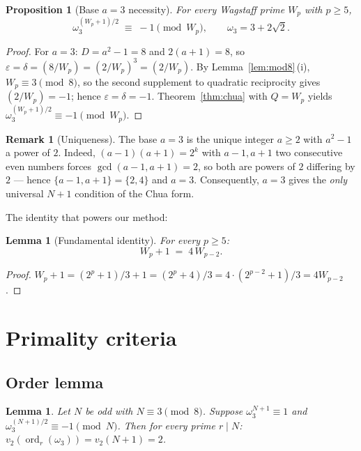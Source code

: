 \documentclass[11pt,a4paper]{amsart}
\theoremstyle{plain}
\newtheorem{proposition}[theorem]{Proposition}
\newtheorem{lemma}[theorem]{Lemma}
\theoremstyle{definition}
\newtheorem{remark}[theorem]{Remark}
\DeclareMathOperator{\ord}{ord}
\newcommand{\wom}{\omega_3}
\newcommand{\sqrttwo}{\sqrt{2}}
\begin{document}
\begin{proposition}[Base $a=3$ necessity]
\label{prop:cond2}
For every Wagstaff prime $W_p$ with $p \geq 5$,
\[
  \wom^{(W_p + 1)/2} \;\equiv\; -1 \pmod{W_p}, \qquad \wom = 3 + 2\sqrttwo.
\]
\end{proposition}

\begin{proof}
For $a = 3$: $D = a^2 - 1 = 8$ and $2(a + 1) = 8$, so $\varepsilon =
\delta = (8/W_p) = (2/W_p)^3 = (2/W_p)$. By
Lemma~\ref{lem:mod8}\,(i), $W_p \equiv 3 \pmod 8$, so the second
supplement to quadratic reciprocity gives $(2/W_p) = -1$; hence
$\varepsilon = \delta = -1$. Theorem~\ref{thm:chua} with $Q = W_p$
yields $\wom^{(W_p + 1)/2} \equiv -1 \pmod{W_p}$.
\end{proof}

\begin{remark}[Uniqueness]
\label{rem:uniqueness}
The base $a = 3$ is the unique integer $a \geq 2$ with $a^2 - 1$ a
power of $2$. Indeed, $(a-1)(a+1) = 2^k$ with $a - 1, a + 1$ two
consecutive even numbers forces $\gcd(a-1, a+1) = 2$, so both are
powers of $2$ differing by $2$ --- hence $\{a-1, a+1\} = \{2, 4\}$
and $a = 3$. Consequently, $a = 3$ gives the \emph{only} universal
$N + 1$ condition of the Chua form.
\end{remark}

The identity that powers our method:

\begin{lemma}[Fundamental identity]
\label{lem:fundamental}
For every $p \geq 5$:
\[
  W_p + 1 \;=\; 4\, W_{p-2}.
\]
\end{lemma}

\begin{proof}
$W_p + 1 = (2^p + 1)/3 + 1 = (2^p + 4)/3 = 4 \cdot (2^{p-2} + 1)/3 =
4 W_{p-2}$.
\end{proof}

\section{Primality criteria}

\subsection{Order lemma}

\begin{lemma}
\label{lem:order}
Let $N$ be odd with $N \equiv 3 \pmod 8$. Suppose
$\wom^{N+1} \equiv 1$ and $\wom^{(N+1)/2} \equiv -1 \pmod{N}$. Then
for every prime $r \mid N$: $v_2(\ord_r(\wom)) = v_2(N+1) = 2$.
\end{lemma}
\end{document}
